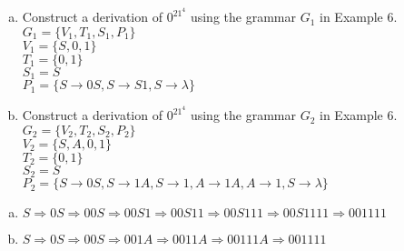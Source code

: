 \documentclass[../main.tex]{subfiles}
\begin{document}
\begin{enumerate}[a)]
	\item Construct a derivation of $0^21^4$ using the grammar $G_1$ in Example 6. \\
		$G_1 = \{V_1, T_1, S_1, P_1\}$ \\
		$V_1 = \{S, 0, 1\}$ \\
		$T_1 = \{0, 1\}$ \\
		$S_1 = S$ \\
		$P_1 = \{S \rightarrow 0S, S \rightarrow S1, S \rightarrow \lambda\}$ \\
	\item Construct a derivation of $0^21^4$ using the grammar $G_2$ in Example 6. \\
		$G_2 = \{V_2, T_2, S_2, P_2\}$ \\
		$V_2 = \{S, A, 0, 1\}$ \\
		$T_2 = \{0, 1\}$ \\
		$S_2 = S$ \\
		$P_2 = \{S \rightarrow 0S, S \rightarrow 1A, S \rightarrow 1, A \rightarrow 1A, A \rightarrow 1, S \rightarrow \lambda\}$ \\
\end{enumerate}

\solution
\begin{enumerate}[a)]
	\item $S \Rightarrow 0S \Rightarrow 00S \Rightarrow 00S1 \Rightarrow 00S11 \Rightarrow 00S111 \Rightarrow 00S1111 \Rightarrow 001111$
	\item $S \Rightarrow 0S \Rightarrow 00S \Rightarrow 001A \Rightarrow 0011A \Rightarrow 00111A \Rightarrow 001111$
\end{enumerate}
\end{document}
